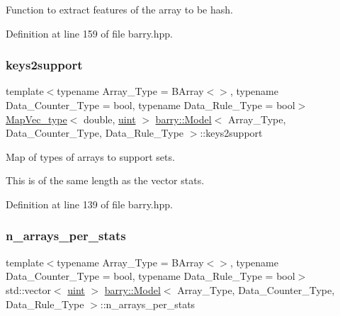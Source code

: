 Function to extract features of the array to be hash. 



Definition at line 159 of file barry.\+hpp.

\mbox{\label{classbarry_1_1_model_a802069270d02f2e2ad7e5f2adb51c2bc}} 
\subsubsection{\texorpdfstring{keys2support}{keys2support}}
{\footnotesize\ttfamily template$<$typename Array\+\_\+\+Type  = B\+Array$<$$>$, typename Data\+\_\+\+Counter\+\_\+\+Type  = bool, typename Data\+\_\+\+Rule\+\_\+\+Type  = bool$>$ \\
\hyperlink{namespacebarry_a2f0d3aab1d67e4c8eaeab9022e16139f}{Map\+Vec\+\_\+type}$<$ double, \hyperlink{namespacebarry_a11dfc53ddb4672278319aa04f1e09a6c}{uint} $>$ \hyperlink{classbarry_1_1_model}{barry\+::\+Model}$<$ Array\+\_\+\+Type, Data\+\_\+\+Counter\+\_\+\+Type, Data\+\_\+\+Rule\+\_\+\+Type $>$\+::keys2support}



Map of types of arrays to support sets. 

This is of the same length as the vector {\ttfamily stats}. 

Definition at line 139 of file barry.\+hpp.

\mbox{\label{classbarry_1_1_model_a6e72cbb235cf592668c286931a488830}} 
\subsubsection{\texorpdfstring{n\+\_\+arrays\+\_\+per\+\_\+stats}{n\_arrays\_per\_stats}}
{\footnotesize\ttfamily template$<$typename Array\+\_\+\+Type  = B\+Array$<$$>$, typename Data\+\_\+\+Counter\+\_\+\+Type  = bool, typename Data\+\_\+\+Rule\+\_\+\+Type  = bool$>$ \\
std\+::vector$<$ \hyperlink{namespacebarry_a11dfc53ddb4672278319aa04f1e09a6c}{uint} $>$ \hyperlink{classbarry_1_1_model}{barry\+::\+Model}$<$ Array\+\_\+\+Type, Data\+\_\+\+Counter\+\_\+\+Type, Data\+\_\+\+Rule\+\_\+\+Type $>$\+::n\+\_\+arrays\+\_\+per\+\_\+stats}



